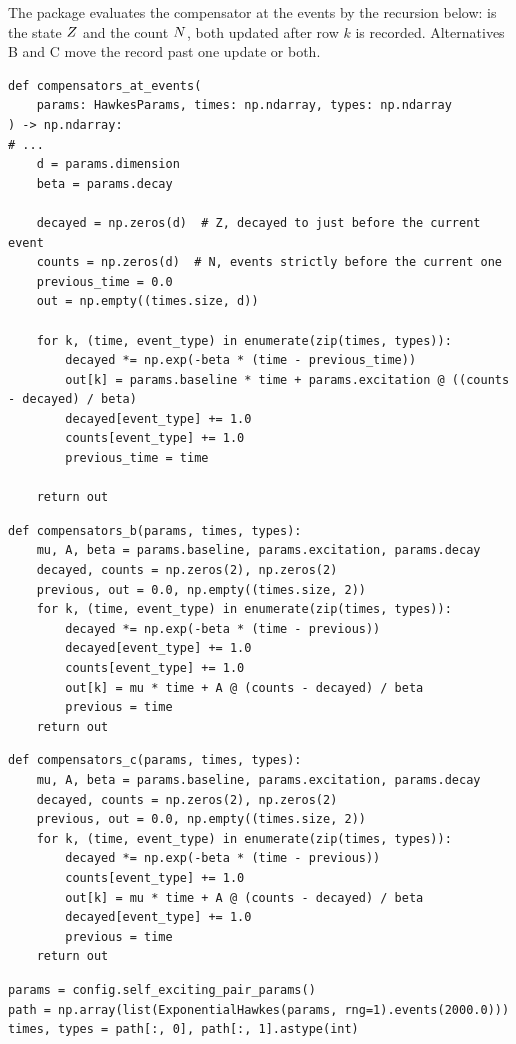 \begin{question}
\label{question.compensatorReadAfterTheJump}
The package evaluates the compensator at the events by the recursion below:
 is the state $Z$ and  the count $N$,
both updated after row $k$ is recorded.
Alternatives B and C move the record past one update or both.
\begin{lstlisting}[caption={\protect\codehl{unito26.lob.hawkes.compensators\_at\_events}, its docstring elided.}, label=listing.compensatorsAtEventsQuote]
def compensators_at_events(
    params: HawkesParams, times: np.ndarray, types: np.ndarray
) -> np.ndarray:
# ...
    d = params.dimension
    beta = params.decay

    decayed = np.zeros(d)  # Z, decayed to just before the current event
    counts = np.zeros(d)  # N, events strictly before the current one
    previous_time = 0.0
    out = np.empty((times.size, d))

    for k, (time, event_type) in enumerate(zip(times, types)):
        decayed *= np.exp(-beta * (time - previous_time))
        out[k] = params.baseline * time + params.excitation @ ((counts - decayed) / beta)
        decayed[event_type] += 1.0
        counts[event_type] += 1.0
        previous_time = time

    return out
\end{lstlisting}
\begin{lstlisting}[caption={Alternative B}, label=listing.compensatorReadAfterBoth]
def compensators_b(params, times, types):
    mu, A, beta = params.baseline, params.excitation, params.decay
    decayed, counts = np.zeros(2), np.zeros(2)
    previous, out = 0.0, np.empty((times.size, 2))
    for k, (time, event_type) in enumerate(zip(times, types)):
        decayed *= np.exp(-beta * (time - previous))
        decayed[event_type] += 1.0
        counts[event_type] += 1.0
        out[k] = mu * time + A @ (counts - decayed) / beta
        previous = time
    return out
\end{lstlisting}
\begin{lstlisting}[caption={Alternative C}, label=listing.compensatorReadAfterTheCount]
def compensators_c(params, times, types):
    mu, A, beta = params.baseline, params.excitation, params.decay
    decayed, counts = np.zeros(2), np.zeros(2)
    previous, out = 0.0, np.empty((times.size, 2))
    for k, (time, event_type) in enumerate(zip(times, types)):
        decayed *= np.exp(-beta * (time - previous))
        counts[event_type] += 1.0
        out[k] = mu * time + A @ (counts - decayed) / beta
        decayed[event_type] += 1.0
        previous = time
    return out
\end{lstlisting}
\begin{lstlisting}[caption={The residuals of the buys, against those of the package}, label=listing.compensatorReadAfterRun]
params = config.self_exciting_pair_params()
path = np.array(list(ExponentialHawkes(params, rng=1).events(2000.0)))
times, types = path[:, 0], path[:, 1].astype(int)


\end{lstlisting}
\end{question}
